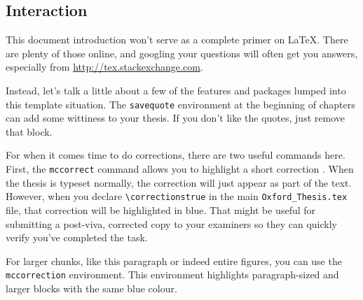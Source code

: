   







\subsection{Interaction}
\label{subsec:interaction}

This document introduction won't serve as a complete primer on \LaTeX.  There are plenty of those online, and googling your questions will often get you answers, especially from \url{http://tex.stackexchange.com}.

Instead, let's talk a little about a few of the features and packages lumped into this template situation.  The \verb|savequote| environment at the beginning of chapters can add some wittiness to your thesis.  If you don't like the quotes, just remove that block.

For when it comes time to do corrections, there are two useful commands here.  First, the \verb|mccorrect| command allows you to highlight a short correction .  When the thesis is typeset normally, the correction will just appear as part of the text.  However, when you declare \verb|\correctionstrue| in the main \verb|Oxford_Thesis.tex| file, that correction will be highlighted in blue.  That might be useful for submitting a post-viva, corrected copy to your examiners so they can quickly verify you've completed the task.

\begin{mccorrection}
For larger chunks, like this paragraph or indeed entire figures, you can use the \verb|mccorrection| environment.  This environment highlights paragraph-sized and larger blocks with the same blue colour.
\end{mccorrection}
